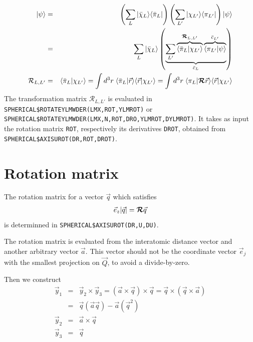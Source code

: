 \documentclass[11pt,a4paper]{report}
\begin{document}
\begin{eqnarray}
|\psi\rangle
&=&\left(\sum_{L}|\bar{\chi}_L\rangle\langle\bar{\pi}_L|\right)
\left(\sum_{L'}|{\chi}_{L'}\rangle\langle{\pi}_{L'}|\right)
|\psi\rangle
\nonumber\\
&=&\sum_{L}|\bar{\chi}_L\rangle
\left(
\underbrace{\sum_{L'}
\overbrace{
\langle\bar{\pi}_L|{\chi}_{L'}\rangle
}^{\bm{\mathcal{R}}_{L,L'}}
\overbrace{\langle{\pi}_{L'}|\psi\rangle}^{\bar{c}_{L'}}
}_{\bar{c}_L}
\right)
\nonumber\\
\mathcal{R}_{L,L'}&=&
\langle\bar{\pi}_L|\chi_{L'}\rangle
=\int d^3r\; \langle\bar{\pi}_L|\vec{r}\rangle
\langle\vec{r}|\chi_{L'}\rangle
=\int d^3r\; \langle\pi_L|\bm{\mathcal{R}}\vec{r}\rangle
\langle\vec{r}|\chi_{L'}\rangle
\end{eqnarray}
The transformation matrix $\mathcal{R}_{L,L'}$ is evaluated in
\verb|SPHERICAL$ROTATEYLMWDER(LMX,ROT,YLMROT)| or
\verb|SPHERICAL$ROTATEYLMWDER(LMX,N,ROT,DRO,YLMROT,DYLMROT)|.  It
takes as input the rotation matrix \verb|ROT|, respectively its
derivatives \verb|DROT|, obtained from
\verb|SPHERICAL$AXISUROT(DR,ROT,DROT)|.



\section{Rotation matrix}
The rotation matrix for a vector $\vec{q}$ which satisfies
\begin{eqnarray}
\vec{e}_z|\vec{q}|=\bm{\mathcal{R}}\vec{q}
\end{eqnarray}
is determinned in \verb|SPHERICAL$AXISUROT(DR,U,DU)|.


The rotation matrix is evaluated from the interatomic distance vector
and another arbitrary vector $\vec{a}$. This vector should not be the
coordinate vector $\vec{e}_j$ with the smallest projection on
$\vec{Q}$, to avoid a divide-by-zero.

Then we construct 
\begin{eqnarray}
\vec{y}_{1}&=&\vec{y}_2\times\vec{y}_3
=(\vec{a}\times\vec{q})\times\vec{q}
=\vec{q}\times(\vec{q}\times\vec{a})
\nonumber\\
&=&\vec{q}(\vec{a}\vec{q})-\vec{a}(\vec{q}^2)
\nonumber\\
\vec{y}_{2}&=&\vec{a}\times\vec{q}
\nonumber\\
\vec{y}_3&=&\vec{q}
\label{eq:rotationdefyvectors}
\end{eqnarray}
\end{document}
